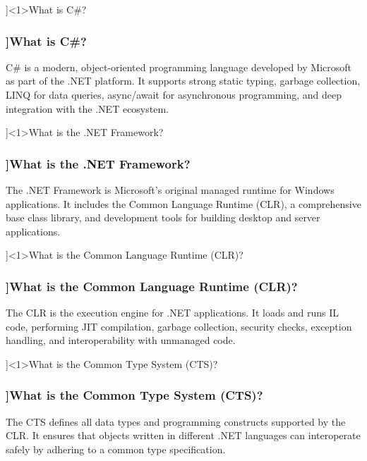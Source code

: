 \QuestionSlide[\CategoryBadge[OOPColor!20]{Language \& Platform}]<1>{What is C\#?}
\begin{frame}[fragile]
  \frametitle{\AnswerTitle[\CategoryBadge[OOPColor!20]{Language \& Platform}]{What is C\#?}}

  {\footnotesize
    C\# is a modern, object-oriented programming language developed by Microsoft as part of the .NET platform. It supports strong static typing, garbage collection, LINQ for data queries, async/await for asynchronous programming, and deep integration with the .NET ecosystem.
  }
\end{frame}

\QuestionSlide[\CategoryBadge[OOPColor!20]{Language \& Platform}]<1>{What is the .NET Framework?}
\begin{frame}[fragile]
  \frametitle{\AnswerTitle[\CategoryBadge[OOPColor!20]{Language \& Platform}]{What is the .NET Framework?}}

  {\footnotesize
    The .NET Framework is Microsoft’s original managed runtime for Windows applications. It includes the Common Language Runtime (CLR), a comprehensive base class library, and development tools for building desktop and server applications.
  }
\end{frame}

\QuestionSlide[\CategoryBadge[OOPColor!20]{Language \& Platform}]<1>{What is the Common Language Runtime (CLR)?}
\begin{frame}[fragile]
  \frametitle{\AnswerTitle[\CategoryBadge[OOPColor!20]{Language \& Platform}]{What is the Common Language Runtime (CLR)?}}

  {\footnotesize
    The CLR is the execution engine for .NET applications. It loads and runs IL code, performing JIT compilation, garbage collection, security checks, exception handling, and interoperability with unmanaged code.
  }
\end{frame}

\QuestionSlide[\CategoryBadge[MemoryColor!20]{Types \& Memory}]<1>{What is the Common Type System (CTS)?}
\begin{frame}[fragile]
  \frametitle{\AnswerTitle[\CategoryBadge[MemoryColor!20]{Types \& Memory}]{What is the Common Type System (CTS)?}}

  {\footnotesize
    The CTS defines all data types and programming constructs supported by the CLR. It ensures that objects written in different .NET languages can interoperate safely by adhering to a common type specification.
  }
\end{frame}

